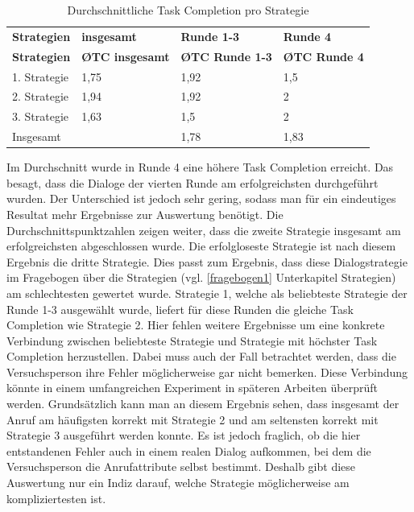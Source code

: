 \documentclass[12pt,a4paper]{scrartcl}
\begin{document}
\begin{longtable}{p{3cm}p{3cm}p{3cm}p{3cm} }
	\label{TCV1}\\
	\caption[Durchschnittliche Task Completion pro Strategie]{Durchschnittliche Task Completion pro Strategie}\\
	\hline
\textbf{Strategien}&\textbf{insgesamt}&\textbf{Runde 1-3} &\textbf{Runde 4}\\
	\hline
	\endfirsthead
	\hline
	\textbf{Strategien}&\textbf{\O TC insgesamt}&\textbf{\O TC Runde 1-3} &\textbf{\O TC Runde 4}\\
	\hline
	\endhead
1. Strategie & 1,75 & 1,92 & 1,5  \\
2. Strategie & 1,94 & 1,92 & 2  \\
3. Strategie & 1,63 & 1,5 & 2  \\
\hline
Insgesamt & & 1,78 & 1,83 \\ 
\hline
\end{longtable}

Im Durchschnitt wurde in Runde 4 eine höhere Task Completion erreicht. Das besagt, dass die Dialoge der vierten Runde am erfolgreichsten durchgeführt wurden. Der Unterschied ist jedoch sehr gering, sodass man für ein eindeutiges Resultat mehr Ergebnisse zur Auswertung benötigt. Die Durchschnittspunktzahlen zeigen weiter, dass die zweite Strategie insgesamt am erfolgreichsten abgeschlossen wurde. Die erfolgloseste Strategie ist nach diesem Ergebnis die dritte Strategie. Dies passt zum Ergebnis, dass diese Dialogstrategie im Fragebogen über die Strategien (vgl. \ref{fragebogen1} Unterkapitel Strategien) am schlechtesten gewertet wurde. Strategie 1, welche als beliebteste Strategie der Runde 1-3 ausgewählt wurde, liefert für diese Runden die gleiche Task Completion wie Strategie 2. Hier fehlen weitere Ergebnisse um eine konkrete Verbindung zwischen beliebteste Strategie und Strategie mit höchster Task Completion herzustellen. Dabei muss auch der Fall betrachtet werden, dass die Versuchsperson ihre Fehler möglicherweise gar nicht bemerken. Diese Verbindung könnte in einem umfangreichen Experiment in späteren Arbeiten überprüft werden. 
Grundsätzlich kann man an diesem Ergebnis sehen, dass insgesamt der Anruf am häufigsten korrekt mit Strategie 2 und am seltensten korrekt mit Strategie 3 ausgeführt werden konnte. \newline
Es ist jedoch fraglich, ob die hier entstandenen Fehler auch in einem realen Dialog aufkommen, bei dem die Versuchsperson die Anrufattribute selbst bestimmt. Deshalb gibt diese Auswertung nur ein Indiz darauf, welche Strategie möglicherweise am kompliziertesten ist. 
\end{document}
